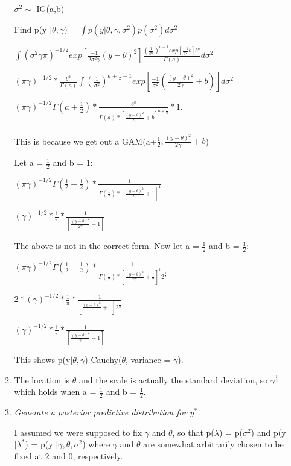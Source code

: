 \documentclass{article}\usepackage[]{graphicx}\usepackage[]{color}
\begin{document}
\begin{enumerate}
\begin{enumerate}
$\sigma^2 \sim$ IG(a,b)

Find p(y $| \theta,\gamma$) = $\int p(y | \theta,\gamma,\sigma^2)p(\sigma^2)d\sigma^2$

\propto $\int (\sigma^{2}\gamma\pi)^{-1/2}exp[\frac{-1}{2\sigma^{2}\gamma}(y-\theta)^{2}]\frac{(\frac{1}{\sigma^{2}})^{a - 1}exp[\frac{-1}{\sigma^2}b]b^{a}}{\Gamma(a)}d\sigma^{2}$

\propto $ (\pi\gamma)^{-1/2}*\frac{b^{a}}{\Gamma(a)} \int (\frac{1}{\sigma^{2}})^{a + \frac{1}{2} - 1} exp[\frac{-1}{\sigma^2}(\frac{(y-\theta)^{2}}{2\gamma} + b)]d\sigma^{2}$

\propto $ (\pi\gamma)^{-1/2}\Gamma(a + \frac{1}{2})*\frac{b^{a}}{\Gamma(a)*[\frac{(y-\theta)^{2}}{2\gamma} + b]^{a+\frac{1}{2}}} * 1.$

This is because we get out a GAM(a+$\frac{1}{2}, \frac{(y-\theta)^{2}}{2\gamma} + b$)

Let a = $\frac{1}{2}$ and b = 1:

\propto $(\pi\gamma)^{-1/2}\Gamma(\frac{1}{2} + \frac{1}{2})*\frac{1}{\Gamma(\frac{1}{2})*[\frac{(y-\theta)^{2}}{2\gamma} + 1]^{1}}$

\propto $(\gamma)^{-1/2}*\frac{1}{\pi}*\frac{1}{[\frac{(y-\theta)^{2}}{2\gamma} + 1]}$

The above is not in the correct form. Now let a = $\frac{1}{2}$ and b = $\frac{1}{2}$:

\propto $(\pi\gamma)^{-1/2}\Gamma(\frac{1}{2} + \frac{1}{2})*\frac{1}{\Gamma(\frac{1}{2})*[\frac{(y-\theta)^{2}}{2\gamma} + \frac{1}{2}]^{1}2^{\frac{1}{2}}}$

\propto $2*(\gamma)^{-1/2}*\frac{1}{\pi}*\frac{1}{[\frac{(y-\theta)^{2}}{\gamma} + 1]2^{\frac{1}{2}}}$

\propto $(\gamma)^{-1/2}*\frac{1}{\pi}*\frac{1}{[\frac{(y-\theta)^{2}}{\gamma} + 1]}$

This shows p(y$|\theta, \gamma$) \propto Cauchy($\theta$, variance = $\gamma$).

\item 
The location is $\theta$ and the scale is actually the standard deviation, so $\gamma^{\frac{1}{2}}$ which holds when a = $\frac{1}{2}$ and b = $\frac{1}{2}$.

\item {\it Generate a posterior predictive distribution for $y^{*}$.}

I assumed we were supposed to fix $\gamma$ and $\theta$, so that p($\lambda$) = p($\sigma^2$) and p(y $| \lambda^{*}$) = p(y $| \gamma, \theta, \sigma^2$) where $\gamma$ and $\theta$ are somewhat arbitrarily chosen to be fixed at 2 and 0, respectively.


\end{enumerate}
\end{enumerate}
\end{document}
